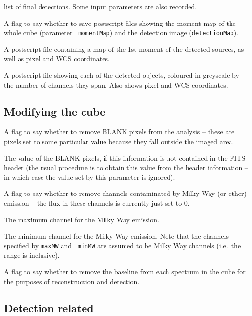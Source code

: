 \documentclass[12pt]{article}
\newcommand{\ie}{i.e.\ }
\newcommand{\entrylabel}[1]{\mbox{\textsf{\bf{#1:}}}\hfil}
\newenvironment{entry}
        {\begin{list}{}%
                {\renewcommand{\makelabel}{\entrylabel}%
                        \setlength{\labelwidth}{30mm}%
                        \setlength{\labelsep}{5pt}%
                        \setlength{\itemsep}{2pt}%
                        \setlength{\parsep}{2pt}%
                        \setlength{\leftmargin}{35mm}%
                }%
        }%
{\end{list}}
\begin{document}
\begin{entry}
  list of final detections. Some input parameters are also recorded.
\item[flagMaps {\tt [true]}] A flag to say whether to save postscript
  files showing the moment map of the whole cube (parameter {\tt
  momentMap}) and the detection image ({\tt detectionMap}).
\item[momentMap {\tt [./latest-moment-map.ps]}] A postscript file
  containing a map of the 1st moment of the detected sources, as well
  as pixel and WCS coordinates.
\item[detectionMap {\tt [./latest-detection-map.ps]}] A postscript
  file showing each of the detected objects, coloured in greyscale by
  the number of channels they span. Also shows pixel and WCS
  coordinates.
\end{entry}

\subsection*{Modifying the cube}
\begin{entry}
\item[flagBlankPix {\tt [true]}] A flag to say whether to remove BLANK
  pixels from the analysis -- these are pixels set to some particular
  value because they fall outside the imaged area.
\item[blankPixValue {\tt [-8.00061]}] The value of the BLANK pixels,
  if this information is not contained in the FITS header (the usual
  procedure is to obtain this value from the header information -- in
  which case the value set by this parameter is ignored).
\item[flagMW {\tt [true]}] A flag to say whether to remove channels
  contaminated by Milky Way (or other) emission -- the flux in these
  channels is currently just set to 0.
\item[maxMW {\tt [112]}] The maximum channel for the Milky Way
  emission.
\item[minMW {\tt [75]}] The minimum channel for the Milky Way
  emission. Note that the channels specified by {\tt maxMW} and {\tt
  minMW} are assumed to be Milky Way channels (\ie the range is
  inclusive).
\item[flagBaseline {\tt [false]}] A flag to say whether to remove the
  baseline from each spectrum in the cube for the purposes of
  reconstruction and detection.
\end{entry}

\subsection*{Detection related}
\end{document}
